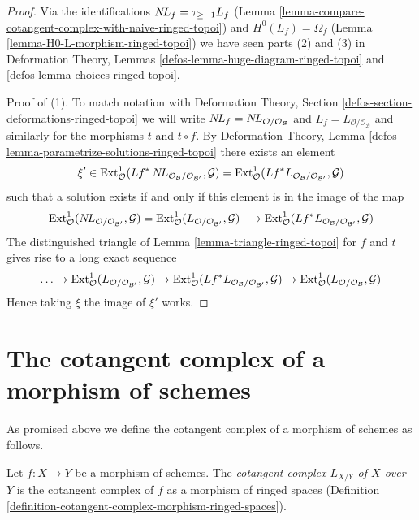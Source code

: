 \begin{proof}
Via the identifications $\mathop{N\!L}\nolimits_f = \tau_{\geq -1}L_f$
(Lemma \ref{lemma-compare-cotangent-complex-with-naive-ringed-topoi}) and
$H^0(L_f) = \Omega_f$
(Lemma \ref{lemma-H0-L-morphism-ringed-topoi})
we have seen parts (2) and (3) in
Deformation Theory, Lemmas \ref{defos-lemma-huge-diagram-ringed-topoi} and
\ref{defos-lemma-choices-ringed-topoi}.

\medskip\noindent
Proof of (1). To match notation with Deformation Theory, Section
\ref{defos-section-deformations-ringed-topoi} we will write
$\mathop{N\!L}\nolimits_f = \mathop{N\!L}\nolimits_{\mathcal{O}/\mathcal{O}_\mathcal{B}}$ and
$L_f = L_{\mathcal{O}/\mathcal{O}_\mathcal{B}}$ and similarly
for the morphisms $t$ and $t \circ f$. By
Deformation Theory, Lemma \ref{defos-lemma-parametrize-solutions-ringed-topoi}
there exists an element
$$
\xi' \in
\mathop{\mathrm{Ext}}\nolimits^1_\mathcal{O}(
Lf^*\mathop{N\!L}\nolimits_{\mathcal{O}_\mathcal{B}/\mathcal{O}_{\mathcal{B}'}}, \mathcal{G}) =
\mathop{\mathrm{Ext}}\nolimits^1_\mathcal{O}(
Lf^*L_{\mathcal{O}_\mathcal{B}/\mathcal{O}_{\mathcal{B}'}}, \mathcal{G})
$$
such that a solution exists if and only if this element is in
the image of the map
$$
\mathop{\mathrm{Ext}}\nolimits^1_\mathcal{O}(
\mathop{N\!L}\nolimits_{\mathcal{O}/\mathcal{O}_{\mathcal{B}'}}, \mathcal{G}) =
\mathop{\mathrm{Ext}}\nolimits^1_\mathcal{O}(
L_{\mathcal{O}/\mathcal{O}_{\mathcal{B}'}}, \mathcal{G})
\longrightarrow
\mathop{\mathrm{Ext}}\nolimits^1_\mathcal{O}(
Lf^*L_{\mathcal{O}_\mathcal{B}/\mathcal{O}_{\mathcal{B}'}}, \mathcal{G})
$$
The distinguished triangle of Lemma \ref{lemma-triangle-ringed-topoi}
for $f$ and $t$ gives rise to a long exact sequence
$$
\ldots \to
\mathop{\mathrm{Ext}}\nolimits^1_\mathcal{O}(
L_{\mathcal{O}/\mathcal{O}_{\mathcal{B}'}}, \mathcal{G}) \to
\mathop{\mathrm{Ext}}\nolimits^1_\mathcal{O}(
Lf^*L_{\mathcal{O}_\mathcal{B}/\mathcal{O}_{\mathcal{B}'}}, \mathcal{G})
\to
\mathop{\mathrm{Ext}}\nolimits^1_\mathcal{O}(
L_{\mathcal{O}/\mathcal{O}_\mathcal{B}}, \mathcal{G})
$$
Hence taking $\xi$ the image of $\xi'$ works.
\end{proof}












\section{The cotangent complex of a morphism of schemes}
\label{section-cotangent-morphism-schemes}

\noindent
As promised above we define the cotangent complex of a morphism of
schemes as follows.

\begin{definition}
\label{definition-cotangent-morphism-schemes}
Let $f : X \to Y$ be a morphism of schemes. The {\it cotangent complex
$L_{X/Y}$ of $X$ over $Y$} is the cotangent complex of $f$ as a
morphism of ringed spaces
(Definition \ref{definition-cotangent-complex-morphism-ringed-spaces}).
\end{definition}

